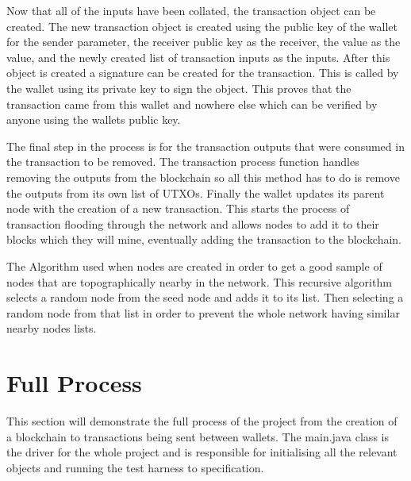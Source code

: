 \documentclass{l4proj}
\begin{document}
Now that all of the inputs have been collated, the transaction object can be created. The new transaction 
object is created using the public key of the wallet for the sender parameter, the receiver public key as the
receiver, the value as the value, and the newly created list of transaction inputs as the inputs. After this 
object is created a signature can be created for the transaction. This is called by the wallet using its private
key to sign the object. This proves that the transaction came from this wallet and nowhere else which can be 
verified by anyone using the wallets public key.

The final step in the process is for the transaction outputs that were consumed in the transaction to be removed.
The transaction process function handles removing the outputs from the blockchain so all this method has to do
is remove the outputs from its own list of UTXOs. Finally the wallet updates its parent node with the creation
of a new transaction. This starts the process of transaction flooding through the network and allows nodes to 
add it to their blocks which they will mine, eventually adding the transaction to the blockchain.

\begin{algorithm}
    \DontPrintSemicolon
    
\caption{
    The Algorithm used when nodes are created in order to get a good sample of nodes that are topographically nearby
    in the network. This recursive algorithm selects a random node from the seed node and adds it to its list. Then
    selecting a random node from that list in order to prevent the whole network having similar nearby nodes lists.
}
\label{alg:nearbyNodes}
\end{algorithm}

\section{Full Process}
This section will demonstrate the full process of the project from the creation of a blockchain to transactions
being sent between wallets. The main.java class is the driver for the whole project and is responsible for
initialising all the relevant objects and running the test harness to specification.
\end{document}

